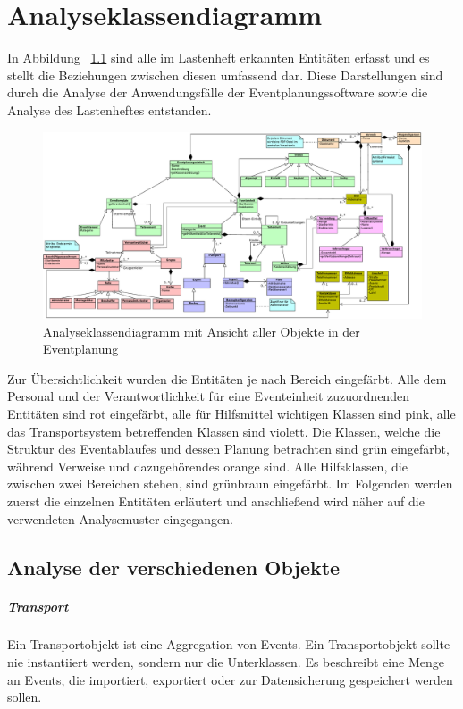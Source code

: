 \chapter{Analyseklassendiagramm}
In Abbildung ~\ref{fig:akd} sind alle im Lastenheft erkannten Entitäten erfasst und es stellt die Beziehungen zwischen diesen umfassend dar. Diese Darstellungen sind durch die Analyse der Anwendungsfälle der Eventplanungssoftware sowie die Analyse des Lastenheftes entstanden.

\begin{figure}[ht!]
    \centering
    \includegraphics[width=0.98\columnwidth]{Bilder/akd.pdf}
    \caption{Analyseklassendiagramm mit Ansicht aller Objekte in der Eventplanung}
    \label{fig:akd}
\end{figure}

Zur Übersichtlichkeit wurden die Entitäten je nach Bereich eingefärbt. Alle dem Personal und der Verantwortlichkeit für eine Eventeinheit zuzuordnenden Entitäten sind rot eingefärbt, alle für Hilfsmittel wichtigen Klassen sind pink, alle das Transportsystem betreffenden Klassen sind violett. Die Klassen, welche die Struktur des Eventablaufes und dessen Planung betrachten sind grün eingefärbt, während Verweise und dazugehörendes orange sind. Alle Hilfsklassen, die zwischen zwei Bereichen stehen, sind grünbraun eingefärbt. Im Folgenden werden zuerst die einzelnen Entitäten erläutert und anschließend wird näher auf die verwendeten Analysemuster eingegangen.

\section{Analyse der verschiedenen Objekte}

\paragraph{Transport}
Ein Transportobjekt ist eine Aggregation von Events. Ein Transportobjekt sollte nie instantiiert werden, sondern nur die Unterklassen. Es beschreibt eine Menge an Events, die importiert, exportiert oder zur Datensicherung gespeichert werden sollen.
